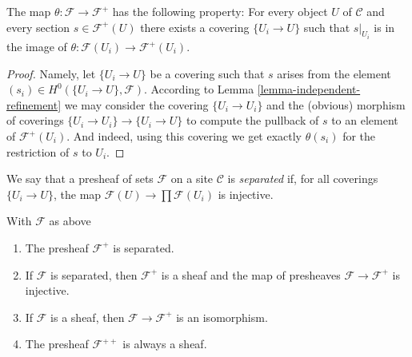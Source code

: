 \begin{lemma}
\label{lemma-plus-surjective}
The map $\theta : \mathcal{F} \to \mathcal{F}^+$ has the following
property: For every object $U$ of $\mathcal{C}$ and every section
$s \in \mathcal{F}^+(U)$ there exists a covering $\{U_i \to U\}$
such that $s|_{U_i}$ is in the image of $\theta : \mathcal{F}(U_i)
\to \mathcal{F}^{+}(U_i)$.
\end{lemma}

\begin{proof}
Namely, let $\{U_i \to U\}$ be a covering such that $s$ arises
from the element $(s_i) \in H^0(\{U_i \to U\}, \mathcal{F})$.
According to Lemma \ref{lemma-independent-refinement} we may
consider the covering $\{U_i \to U_i\}$ and the (obvious) morphism
of coverings $\{U_i \to U_i\} \to \{U_i \to U\}$ to compute the
pullback of $s$ to an element of $\mathcal{F}^+(U_i)$. And indeed,
using this covering we get exactly $\theta(s_i)$ for the restriction
of $s$ to $U_i$.
\end{proof}

\begin{definition}
\label{definition-separated}
We say that a presheaf of sets $\mathcal{F}$ on a site
$\mathcal{C}$ is {\it separated} if, for all coverings
$\{U_i \rightarrow U\}$, the map
$\mathcal{F}(U) \to \prod \mathcal{F}(U_i)$ is injective.
\end{definition}

\begin{theorem}
\label{theorem-plus}
With $\mathcal{F}$ as above
\begin{enumerate}
\item
\label{item-sep}
The presheaf $\mathcal{F}^+$ is separated.
\item
\label{item-sheaf}
If $\mathcal{F}$ is separated, then $\mathcal{F}^+$ is a sheaf
and the map of presheaves $\mathcal{F} \to \mathcal{F}^+$ is injective.
\item
\label{item-plus-iso}
If $\mathcal{F}$ is a sheaf, then $\mathcal{F} \to \mathcal{F}^+$
is an isomorphism.
\item
\label{item-plusplus}
The presheaf $\mathcal{F}^{++}$ is always a sheaf.
\end{enumerate}
\end{theorem}

